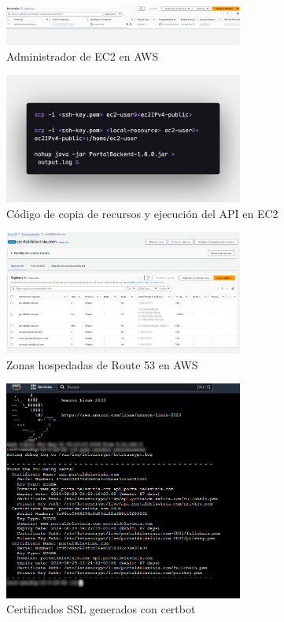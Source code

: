 \begin{figure}[H]
    \centering
    \includegraphics[width=0.7\textwidth]{resources/images/aws-ec2}
    \caption{Administrador de EC2 en AWS}
    \label{fig:ec2}
\end{figure}

\begin{figure}[H]
    \centering
    \includegraphics[width=0.7\textwidth]{resources/images/aws-ec2-code}
    \caption{Código de copia de recursos y ejecución del API en EC2}
    \label{fig:ec2-code}
\end{figure}

\begin{figure}[H]
    \centering
    \includegraphics[width=0.7\textwidth]{resources/images/aws-route53}
    \caption{Zonas hospedadas de Route 53 en AWS}
    \label{fig:route53}
\end{figure}

\begin{figure}[H]
    \centering
    \includegraphics[width=0.7\textwidth]{resources/images/aws-certificates}
    \caption{Certificados SSL generados con certbot}
    \label{fig:certbot}
\end{figure}

